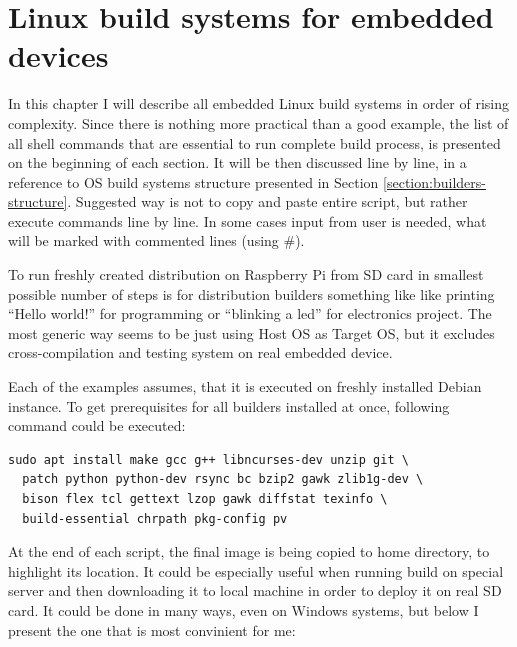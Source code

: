 \documentclass[printmode]{mgr}
\begin{document}
\chapter{Linux build systems for embedded devices}
\label{chapter:build-systems}






In this chapter I will describe all embedded Linux build systems in order of rising complexity.
Since there is nothing more practical than a good example, the list of all shell commands that are essential to run complete build process, is presented on the beginning of each section.
It will be then discussed line by line, in a reference to OS build systems structure presented in Section \ref{section:builders-structure}.
Suggested way is not to copy and paste entire script, but rather execute commands line by line.
In some cases input from user is needed, what will be marked with commented lines (using \#).

To run freshly created distribution on Raspberry Pi from SD card in smallest possible number of steps is for distribution builders something like like printing ``Hello world!'' for programming or ``blinking a led'' for electronics project.
The most generic way seems to be just using Host OS as Target OS, but it excludes cross-compilation and testing system on real embedded device.

Each of the examples assumes, that it is executed on freshly installed Debian instance.
To get prerequisites for all builders installed at once, following command could be executed:


\begin{lstlisting}
sudo apt install make gcc g++ libncurses-dev unzip git \
  patch python python-dev rsync bc bzip2 gawk zlib1g-dev \ 
  bison flex tcl gettext lzop gawk diffstat texinfo \
  build-essential chrpath pkg-config pv
\end{lstlisting}

At the end of each script, the final image is being copied to home directory, to highlight its location.
It could be especially useful when running build on special server and then downloading it to local machine in order to deploy it on real SD card.
It could be done in many ways, even on Windows systems, but below I present the one that is most convinient for me:
\end{document}
